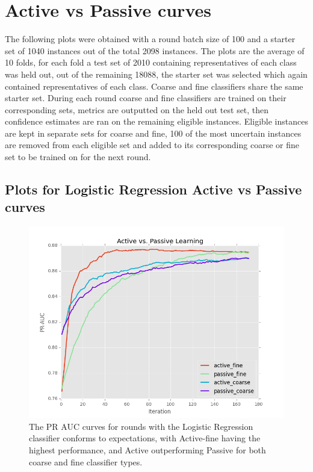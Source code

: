 \documentclass[ms]{nuthesis}
\begin{document}
\section{Active vs Passive curves}
\par The following plots were obtained with a round batch size of 100
and a starter set of 1040 instances out of the total 2098 instances.
The plots are the average of 10 folds, for each fold a test set of 2010
containing representatives of each class was held out, out of the remaining
18088, the starter set was selected which again contained representatives of
each class. Coarse and fine classifiers share the same starter set. During
 each round coarse and fine classifiers are trained on their corresponding
 sets, metrics are outputted on the held out test set, then confidence estimates
 are ran on the remaining eligible instances. Eligible instances are kept in
 separate sets for coarse and fine, 100 of the most uncertain instances are removed
 from each eligible set and added to its corresponding coarse or fine set to be
 trained on for the next round.


\FloatBarrier
\subsection{Plots for Logistic Regression Active vs Passive curves}
\begin{figure}[!htb]
	\centering
    \includegraphics[width=1.0\columnwidth]{fig/runActPassLogReg_pr}
    \caption{The PR AUC curves for rounds with the Logistic
Regression classifier conforms to expectations, with Active-fine having
the highest performance, and Active outperforming Passive for both coarse
and fine classifier types.}
\label{fig:runActPassLogReg_pr}
\end{figure}
\FloatBarrier
\end{document}
